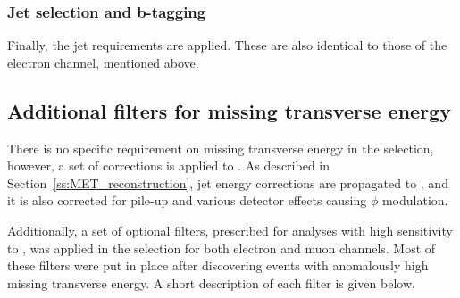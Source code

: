 \subsubsection*{Jet selection and b-tagging}
Finally, the jet requirements are applied. These are also identical to those of the electron channel, mentioned above.



\subsection{Additional filters for missing transverse energy}
\label{ss_xsection:met_filters}

There is no specific requirement on missing transverse energy in the selection, however, a set of corrections is applied
to \MET. As described in Section~\ref{ss:MET_reconstruction}, jet energy corrections are propagated to \MET, and it is
also corrected for pile-up and various detector effects causing $\phi$ modulation.

Additionally, a set of optional filters, prescribed for analyses with high sensitivity to \MET, was applied in the
selection for both electron and muon channels. Most of these filters were put in place after discovering events with
anomalously high missing transverse energy. A short description of each filter is given below.

